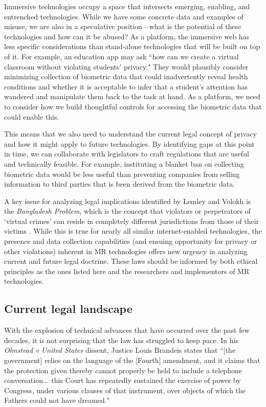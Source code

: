 Immersive technologies occupy a space that intersects emerging, enabling, and entrenched technologies. While we have some concrete data and examples of misuse, we are also in a speculative position---what is the potential of these technologies and how can it be abused? As a platform, the immersive web has less specific considerations than stand-alone technologies that will be built on top of it. For example, an education app may ask ``how can we create a virtual classroom without violating students' privacy." They would plausibly consider minimizing collection of biometric data that could inadvertently reveal health conditions and whether it is acceptable to infer that a student's attention has wandered and manipulate them back to the task at hand. As a platform, we need to consider how we build thoughtful controls for accessing the biometric data that could enable this.

This means that we also need to understand the current legal concept of privacy and how it might apply to future technologies. By identifying gaps at this point in time, we can collaborate with legislators to craft regulations that are useful and technically feasible. For example, instituting a blanket ban on collecting biometric data would be less useful than preventing companies from selling information to third parties that is been derived from the biometric data.

A key issue for analyzing legal implications identified by Lemley and Volokh is the \emph{Bangladesh Problem}, which is the concept that violators or perpetrators of `virtual crimes' can reside in completely different jurisdictions from those of their victims \cite{lemley2017law}. While this is true for nearly all similar internet-enabled technologies, the presence and data collection capabilities (and ensuing opportunity for privacy or other violations) inherent in MR technologies offers new urgency in analyzing current and future legal doctrine. These laws should be informed by both ethical principles as the ones listed here and the researchers and implementors of MR technologies.

\subsection{Current legal landscape}\label{sec:laws}

With the explosion of technical advances that have occurred over the past few decades, it is not surprising that the law has struggled to keep pace. In his \emph{Olmstead v United States} dissent, Justice Louis Brandeis states that ``[the government] relies on the language of the [Fourth] amendment, and it claims that the protection given thereby cannot properly be held to include a telephone conversation... this Court has repeatedly sustained the exercise of power by Congress, under various clauses of that instrument, over objects of which the Fathers could not have dreamed."

